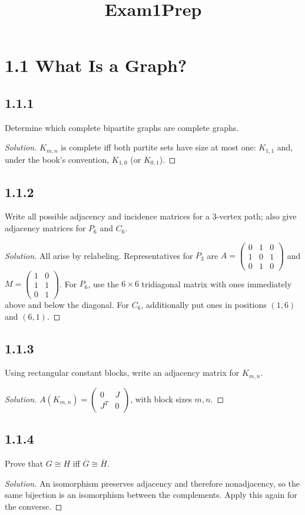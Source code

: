 \documentclass[12pt]{amsart}
\title{Exam1Prep}
\date{}
\newenvironment{solution}{\begin{proof}[Solution]}{\end{proof}}
\begin{document}
\maketitle

    \section*{1.1 What Is a Graph?}
    \subsection*{1.1.1} Determine which complete bipartite graphs are complete graphs.
    \begin{solution}$K_{m,n}$ is complete iff both partite sets have size at most one: $K_{1,1}$ and, under the book's convention, $K_{1,0}$ (or $K_{0,1}$).\end{solution}
    \subsection*{1.1.2} Write all possible adjacency and incidence matrices for a 3-vertex path; also give adjacency matrices for $P_6$ and $C_6$.
    \begin{solution}All arise by relabeling. Representatives for $P_3$ are
        $A=\begin{pmatrix}0&1&0\\1&0&1\\0&1&0\end{pmatrix}$ and
        $M=\begin{pmatrix}1&0\\1&1\\0&1\end{pmatrix}$.
        For $P_6$, use the $6\times6$ tridiagonal matrix with ones immediately above and below the diagonal. For $C_6$, additionally put ones in positions $(1,6)$ and $(6,1)$.\end{solution}
    \subsection*{1.1.3} Using rectangular constant blocks, write an adjacency matrix for $K_{m,n}$.
    \begin{solution}$A(K_{m,n})=\begin{pmatrix}0&J\\J^T&0\end{pmatrix}$, with block sizes $m,n$.\end{solution}
    \subsection*{1.1.4} Prove that $G\cong H$ iff $\overline G\cong\overline H$.
    \begin{solution}An isomorphism preserves adjacency and therefore nonadjacency, so the same bijection is an isomorphism between the complements. Apply this again for the converse.\end{solution}
\end{document}
